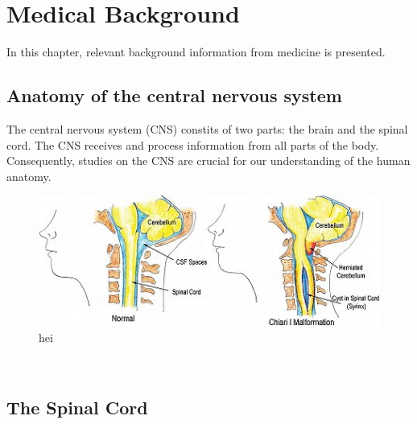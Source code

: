 \chapter{Medical Background}

In this chapter, relevant background information from medicine is presented. 

\section{Anatomy of the central nervous system}
The central nervous system (CNS) constits of two parts: the brain and the spinal cord. The CNS receives and process information from all parts of the body. Consequently, studies on the CNS are crucial for our understanding of the human anatomy.
\begin{figure}
\includegraphics[scale=0.8]{figures/Ida_CSF.png}
\caption{hei}
\end{figure}
\\
\section{The Spinal Cord}


